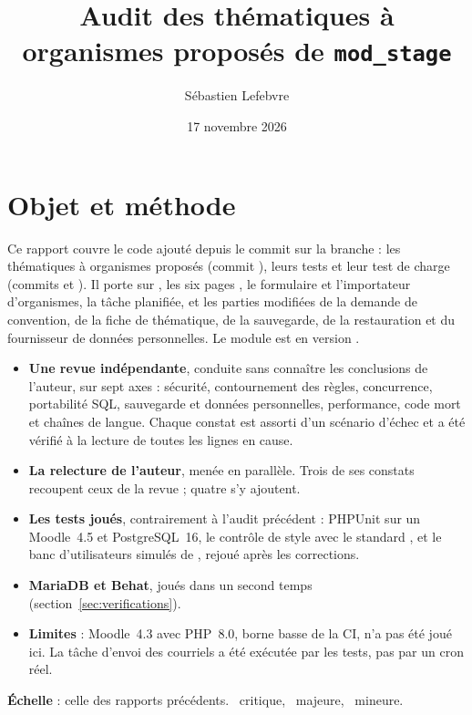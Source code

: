 \documentclass[11pt,a4paper]{article}
\title{Audit des thématiques à organismes proposés de \texttt{mod\_stage}}
\author{Sébastien Lefebvre}
\date{17 novembre 2026}
\newcommand{\grav}[1]{\textbf{\textcolor{#1}{\textbullet}}}
\newcommand{\maj}{\grav{orange}}
\newcommand{\mineure}{\grav{gray}}
\newcommand{\crit}{\grav{red}}
\begin{document}
\maketitle

\section{Objet et méthode}

Ce rapport couvre le code ajouté depuis le commit  sur la branche
 : les thématiques à organismes proposés (commit ), leurs
tests et leur test de charge (commits  et ). Il porte sur
, les six pages , le formulaire et l'importateur
d'organismes, la tâche planifiée, et les parties modifiées de la demande de convention, de la fiche
de thématique, de la sauvegarde, de la restauration et du fournisseur de données personnelles.
Le module est en version .

\begin{itemize}
  \item \textbf{Une revue indépendante}, conduite sans connaître les conclusions de l'auteur, sur
    sept axes : sécurité, contournement des règles, concurrence, portabilité SQL, sauvegarde et
    données personnelles, performance, code mort et chaînes de langue. Chaque constat est assorti
    d'un scénario d'échec et a été vérifié à la lecture de toutes les lignes en cause.
  \item \textbf{La relecture de l'auteur}, menée en parallèle. Trois de ses constats recoupent ceux
    de la revue ; quatre s'y ajoutent.
  \item \textbf{Les tests joués}, contrairement à l'audit précédent : PHPUnit sur un Moodle~4.5
    et PostgreSQL~16, le contrôle de style  avec le standard , et le banc
    d'utilisateurs simulés de , rejoué après les corrections.
  \item \textbf{MariaDB et Behat}, joués dans un second temps (section~\ref{sec:verifications}).
  \item \textbf{Limites} : Moodle~4.3 avec PHP~8.0, borne basse de la CI, n'a pas été joué ici. La
    tâche d'envoi des courriels a été exécutée par les tests, pas par un cron réel.
\end{itemize}

\noindent\textbf{Échelle} : celle des rapports précédents. \crit~critique, \maj~majeure,
\mineure~mineure.
\end{document}
